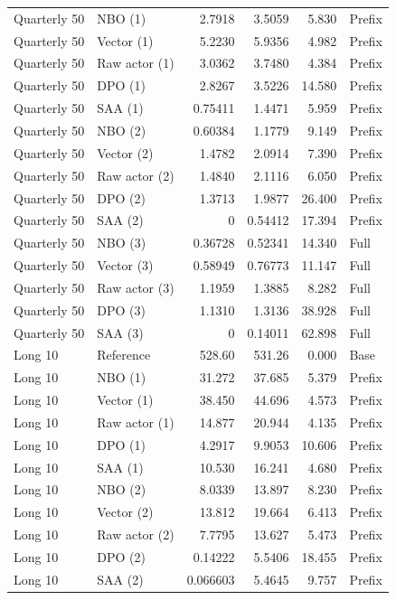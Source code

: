 \begin{longtable}{llrrrl}
Quarterly 50 & NBO (1) & 2.7918 & 3.5059 & 5.830 & Prefix\\
Quarterly 50 & Vector (1) & 5.2230 & 5.9356 & 4.982 & Prefix\\
Quarterly 50 & Raw actor (1) & 3.0362 & 3.7480 & 4.384 & Prefix\\
Quarterly 50 & DPO (1) & 2.8267 & 3.5226 & 14.580 & Prefix\\
Quarterly 50 & SAA (1) & 0.75411 & 1.4471 & 5.959 & Prefix\\
Quarterly 50 & NBO (2) & 0.60384 & 1.1779 & 9.149 & Prefix\\
Quarterly 50 & Vector (2) & 1.4782 & 2.0914 & 7.390 & Prefix\\
Quarterly 50 & Raw actor (2) & 1.4840 & 2.1116 & 6.050 & Prefix\\
Quarterly 50 & DPO (2) & 1.3713 & 1.9877 & 26.400 & Prefix\\
Quarterly 50 & SAA (2) & 0 & 0.54412 & 17.394 & Prefix\\
Quarterly 50 & NBO (3) & 0.36728 & 0.52341 & 14.340 & Full\\
Quarterly 50 & Vector (3) & 0.58949 & 0.76773 & 11.147 & Full\\
Quarterly 50 & Raw actor (3) & 1.1959 & 1.3885 & 8.282 & Full\\
Quarterly 50 & DPO (3) & 1.1310 & 1.3136 & 38.928 & Full\\
Quarterly 50 & SAA (3) & 0 & 0.14011 & 62.898 & Full\\
\addlinespace
Long 10 & Reference & 528.60 & 531.26 & 0.000 & Base\\
Long 10 & NBO (1) & 31.272 & 37.685 & 5.379 & Prefix\\
Long 10 & Vector (1) & 38.450 & 44.696 & 4.573 & Prefix\\
Long 10 & Raw actor (1) & 14.877 & 20.944 & 4.135 & Prefix\\
Long 10 & DPO (1) & 4.2917 & 9.9053 & 10.606 & Prefix\\
Long 10 & SAA (1) & 10.530 & 16.241 & 4.680 & Prefix\\
Long 10 & NBO (2) & 8.0339 & 13.897 & 8.230 & Prefix\\
Long 10 & Vector (2) & 13.812 & 19.664 & 6.413 & Prefix\\
Long 10 & Raw actor (2) & 7.7795 & 13.627 & 5.473 & Prefix\\
Long 10 & DPO (2) & 0.14222 & 5.5406 & 18.455 & Prefix\\
Long 10 & SAA (2) & 0.066603 & 5.4645 & 9.757 & Prefix\\

\end{longtable}
